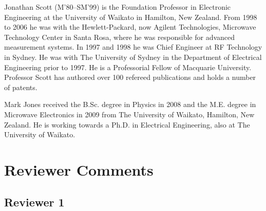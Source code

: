 \documentclass[journal, a4paper]{IEEEtran}
\begin{document}
\begin{IEEEbiography}{Jonathan Scott}
(M'80--SM'99) is the Foundation Professor in
Electronic Engineering at the University of Waikato in Hamilton, New
Zealand.  From 1998 to 2006 he was with the Hewlett-Packard,
now Agilent Technologies, Microwave Technology Center in Santa Rosa,
where he was responsible for advanced measurement systems.  In 1997 and
1998 he was Chief Engineer at RF Technology in Sydney.  He was with The
University of Sydney in the Department of Electrical Engineering prior
to 1997.  He is a Professorial Fellow of Macquarie
University.  Professor Scott has authored over 100 refereed
publications and holds a number of patents.
\end{IEEEbiography}


\begin{IEEEbiography}{Mark Jones}
received the B.Sc. degree in Physics in 2008 and the M.E. degree in Microwave Electronics in 2009 from The University of Waikato, Hamilton, New Zealand.
He is working towards a Ph.D. in Electrical Engineering, also at The University of Waikato.
\end{IEEEbiography}

\section*{Reviewer Comments}

\subsection*{Reviewer 1}
\end{document}

